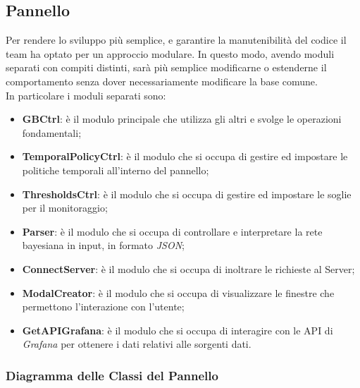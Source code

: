\subsection{Pannello}\label{archPannello}
Per rendere lo sviluppo più semplice, e garantire la manutenibilità del codice il team ha optato per un approccio modulare. In questo modo, avendo moduli separati con compiti distinti, sarà più semplice modificarne o estenderne il comportamento senza dover necessariamente modificare la base comune.\\
In particolare i moduli separati sono:
\begin{itemize}
	\item \textbf{GBCtrl}: è il modulo principale che utilizza gli altri e svolge le operazioni fondamentali;
	\item \textbf{TemporalPolicyCtrl}: è il modulo che si occupa di gestire ed impostare le politiche temporali all'interno del pannello;
	\item \textbf{ThresholdsCtrl}: è il modulo che si occupa di gestire ed impostare le soglie per il monitoraggio;
	\item \textbf{Parser}: è il modulo che si occupa di controllare e interpretare la rete bayesiana in input, in formato \textit{JSON};
	\item \textbf{ConnectServer}: è il modulo che si occupa di inoltrare le richieste al Server;
	\item \textbf{ModalCreator}: è il modulo che si occupa di visualizzare le finestre che permettono l'interazione con l'utente;
	\item \textbf{GetAPIGrafana}: è il modulo che si occupa di interagire con le API di \textit{Grafana} per ottenere i dati relativi alle sorgenti dati.
\end{itemize}


\subsubsection{Diagramma delle Classi del Pannello}

